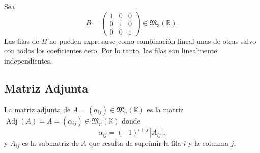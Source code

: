 \documentclass[a4paper,12pt]{article}
\begin{document}
\begin{ejemplo}[title=Ejemplo de líneas linealmente independientes]
Sea
\[
B =
\begin{pmatrix}
1 & 0 & 0 \\
0 & 1 & 0 \\
0 & 0 & 1
\end{pmatrix} \in \mathfrak{M}_3(\mathbb{R}).
\]
Las filas de $B$ no pueden expresarse como combinación lineal unas de otras salvo con todos los coeficientes cero.  
Por lo tanto, las filas son linealmente independientes.
\end{ejemplo}

\subsection{Matriz Adjunta}

\begin{procedimiento}[title=Matriz Adjunta]
La matriz adjunta de $A = (a_{ij}) \in \mathfrak{M}_n(\mathbb{K})$ es la matriz $\operatorname{Adj}(A) = \overline{A} = (\alpha_{ij}) \in \mathfrak{M}_n(\mathbb{K})$ donde
\[
\alpha_{ij} = (-1)^{i+j} \, |A_{ij}|,
\]
y $A_{ij}$ es la submatriz de $A$ que resulta de suprimir la fila $i$ y la columna $j$.
\end{procedimiento}
\end{document}
